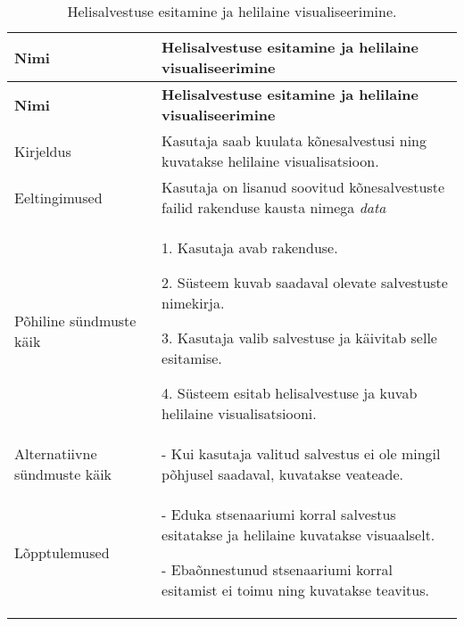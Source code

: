 \begin{longtable}{|p{2.5cm}|p{11cm}|}
    \caption{{Helisalvestuse esitamine ja helilaine visualiseerimine.}}
    \label{tab:kasutusjuht5}\\ \hline
    \textbf{Nimi} &  \textbf{Helisalvestuse esitamine ja helilaine visualiseerimine}  \\
    \hline
    \endfirsthead
    \hline
    \textbf{Nimi} &  \textbf{Helisalvestuse esitamine ja helilaine visualiseerimine}  \\
    \hline
    \endhead
    \hline
    \endfoot
    \hline
    \endlastfoot
    Kirjeldus & Kasutaja saab kuulata kõnesalvestusi ning kuvatakse helilaine visualisatsioon.\\ \hline
    Eeltingimused & Kasutaja on lisanud soovitud kõnesalvestuste failid rakenduse kausta nimega \textit{data}\\ \hline
    Põhiline sündmuste käik & 
    1. Kasutaja avab rakenduse.
    
    2. Süsteem kuvab saadaval olevate salvestuste nimekirja.
    
    3. Kasutaja valib salvestuse ja käivitab selle esitamise.
    
    4. Süsteem esitab helisalvestuse ja kuvab helilaine visualisatsiooni.
    \\ \hline
    Alternatiivne sündmuste käik & 
    - Kui kasutaja valitud salvestus ei ole mingil põhjusel saadaval, kuvatakse veateade.
    \\ \hline
    Lõpptulemused & 
    - Eduka stsenaariumi korral salvestus esitatakse ja helilaine kuvatakse visuaalselt.
    
    - Ebaõnnestunud stsenaariumi korral esitamist ei toimu ning kuvatakse teavitus.
    \\ \hline
\end{longtable}

